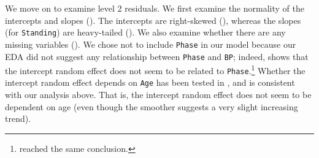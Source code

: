 \documentclass[12pt,twoside,letterpaper]{article}
\theoremstyle{definition}
\theoremstyle{definition}
\begin{document}
We move on to examine level 2 residuals. We first examine the normality of the intercepts and slopes (). The intercepts are right-skewed (), whereas the slopes (for \texttt{Standing}) are heavy-tailed (). We also examine whether there are any missing variables (). We chose not to include \texttt{Phase} in our model because our EDA did not suggest any relationship between \texttt{Phase} and \texttt{BP}; indeed,  shows that the intercept random effect does not seem to be related to \texttt{Phase}.\footnote{\citet[][~ p. 231]{goldstein_ambulatory_2000} reached the same conclusion.} Whether the intercept random effect depends on \texttt{Age} has been tested in , and  is consistent with our analysis above. That is, the intercept random effect does not seem to be dependent on age (even though the smoother suggests a very slight increasing trend).
\end{document}
